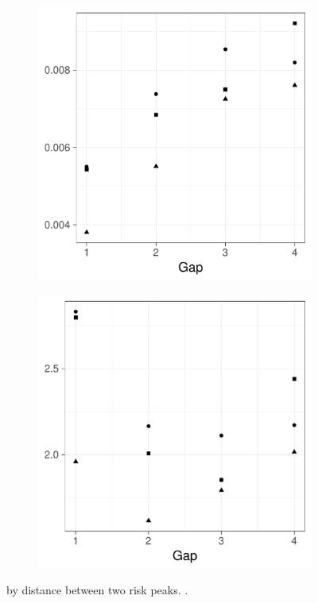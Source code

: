 \begin{figure}[htbp]
    \begin{subfigure}[b]{0.49\textwidth}
        \includegraphics[width=\textwidth]{results/by_two_peaks/RMISE-vs-risk-peak-gap}
        \caption{}
    \end{subfigure}
    \begin{subfigure}[b]{0.49\textwidth}
        \includegraphics[width=\textwidth]{results/by_two_peaks/NMISE-vs-risk-peak-gap}
        \caption{}
    \end{subfigure}
    \caption[ by distance between two risk peaks]{ by distance between two risk peaks. \errorplotcaption.}
    \label{fig:ise:p1.4_100_G}
\end{figure}

